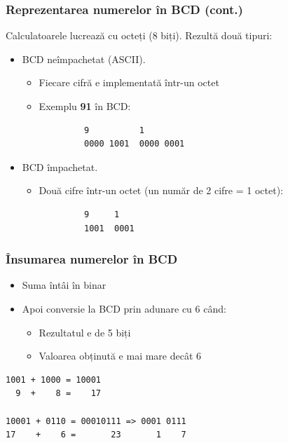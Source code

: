 \documentclass{beamer}
\begin{document}
\begin{frame}[fragile]\frametitle{Reprezentarea numerelor în BCD (cont.)}

Calculatoarele lucrează cu octeți (8 biți). Rezultă două tipuri:

\begin{itemize}
	 \setlength{\itemsep}{1.5em}
	\item BCD neîmpachetat (ASCII). 
	\begin{itemize}  
	  \item Fiecare cifră e implementată într-un octet 
	  \item Exemplu \textbf{91} în BCD:
		\begin{verbatim}
		 9          1
		 0000 1001  0000 0001
		\end{verbatim}
	\end{itemize}
	\item BCD împachetat. 
	\begin{itemize}
	  \item Două cifre într-un octet (un număr de 2 cifre = 1 octet):
		\begin{verbatim}
		 9     1
		 1001  0001
		\end{verbatim}
	\end{itemize}
\end{itemize}
\end{frame}

\begin{frame}[fragile]\frametitle{Însumarea numerelor în BCD}

  \begin{itemize}
	\item Suma întâi în binar
	\item Apoi conversie la BCD prin adunare cu 6 când:
		\begin{itemize}
			\item Rezultatul e de 5 biți
			\item Valoarea obținută e mai mare decât 6
		\end{itemize}
  \end{itemize}

\begin{verbatim}
1001 + 1000 = 10001
  9  +    8 =    17

10001 + 0110 = 00010111 => 0001 0111
17    +    6 =       23       1    7
\end{verbatim}


\end{frame}
\end{document}
